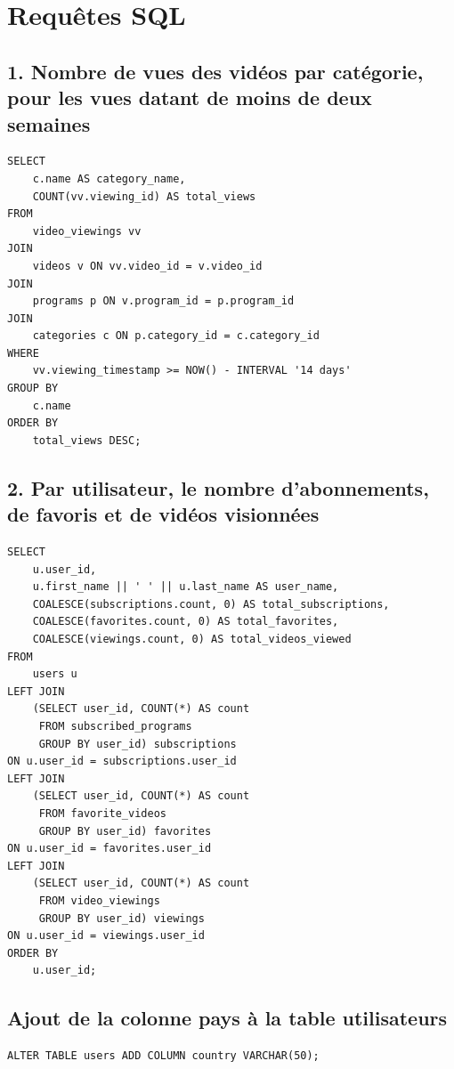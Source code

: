 \documentclass[a4paper, 12pt]{article}
\begin{document}
\section*{Requêtes SQL}

\subsection*{1. Nombre de vues des vidéos par catégorie, pour les vues datant de moins de deux semaines}

\begin{lstlisting}
SELECT 
    c.name AS category_name,
    COUNT(vv.viewing_id) AS total_views
FROM 
    video_viewings vv
JOIN 
    videos v ON vv.video_id = v.video_id
JOIN 
    programs p ON v.program_id = p.program_id
JOIN 
    categories c ON p.category_id = c.category_id
WHERE 
    vv.viewing_timestamp >= NOW() - INTERVAL '14 days'
GROUP BY 
    c.name
ORDER BY 
    total_views DESC;
\end{lstlisting}

\subsection*{2. Par utilisateur, le nombre d'abonnements, de favoris et de vidéos visionnées}

\begin{lstlisting}
SELECT 
    u.user_id,
    u.first_name || ' ' || u.last_name AS user_name,
    COALESCE(subscriptions.count, 0) AS total_subscriptions,
    COALESCE(favorites.count, 0) AS total_favorites,
    COALESCE(viewings.count, 0) AS total_videos_viewed
FROM 
    users u
LEFT JOIN 
    (SELECT user_id, COUNT(*) AS count 
     FROM subscribed_programs 
     GROUP BY user_id) subscriptions 
ON u.user_id = subscriptions.user_id
LEFT JOIN 
    (SELECT user_id, COUNT(*) AS count 
     FROM favorite_videos 
     GROUP BY user_id) favorites 
ON u.user_id = favorites.user_id
LEFT JOIN 
    (SELECT user_id, COUNT(*) AS count 
     FROM video_viewings 
     GROUP BY user_id) viewings 
ON u.user_id = viewings.user_id
ORDER BY 
    u.user_id;
\end{lstlisting}

\subsection*{Ajout de la colonne pays à la table utilisateurs}

\begin{lstlisting}
ALTER TABLE users ADD COLUMN country VARCHAR(50);
\end{lstlisting}
\end{document}
